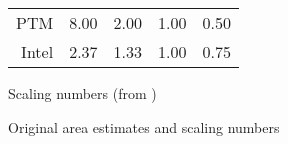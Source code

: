 \begin{figure}[h]
\begin{subtable}{.45\textwidth}
{\begin{tabular}{r|cccc}
                    PTM  & 8.00          & 2.00         & 1.00         & 0.50\\
                  Intel  & 2.37          & 1.33         & 1.00         & 0.75\\
          \bottomrule
        \end{tabular}
        }
      \captionsetup{justification=centering, skip=9pt}
      \vspace{3mm}
      \caption{Scaling numbers (from \cite{schabel2014energy})}
      \label{tab:scalingNumbers}
    \end{subtable}
\vspace{-2mm}
\caption{Original area estimates and scaling numbers}
\label{fig:areaAndScalingEstimates}
\end{figure}

